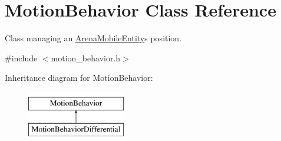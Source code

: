 \hypertarget{class_motion_behavior}{}\section{Motion\+Behavior Class Reference}
\label{class_motion_behavior}


Class managing an \mbox{\hyperlink{class_arena_mobile_entity}{Arena\+Mobile\+Entity}}\textquotesingle{}s position.  




{\ttfamily \#include $<$motion\+\_\+behavior.\+h$>$}

Inheritance diagram for Motion\+Behavior\+:\begin{figure}[H]
\begin{center}
\leavevmode
\includegraphics[height=2.000000cm]{class_motion_behavior}
\end{center}
\end{figure}
